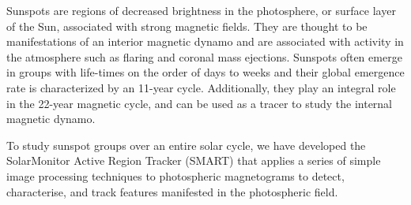 


\begin{abstracts}        %
Sunspots are regions of decreased brightness in the photosphere, or surface layer of the Sun, associated with strong magnetic fields. They are thought to be manifestations of an interior magnetic dynamo and are associated with activity in the atmosphere such as flaring and coronal mass ejections. Sunspots often emerge in groups with life-times on the order of days to weeks and their global emergence rate is characterized by an 11-year cycle. Additionally, they play an integral role in the 22-year magnetic cycle, and can be used as a tracer to study the internal magnetic dynamo. %

To study sunspot groups over an entire solar cycle, we have developed the SolarMonitor Active Region Tracker (SMART) that applies a series of simple image processing techniques to photospheric magnetograms to detect, characterise, and track features manifested in the photospheric field.


\end{abstracts}
